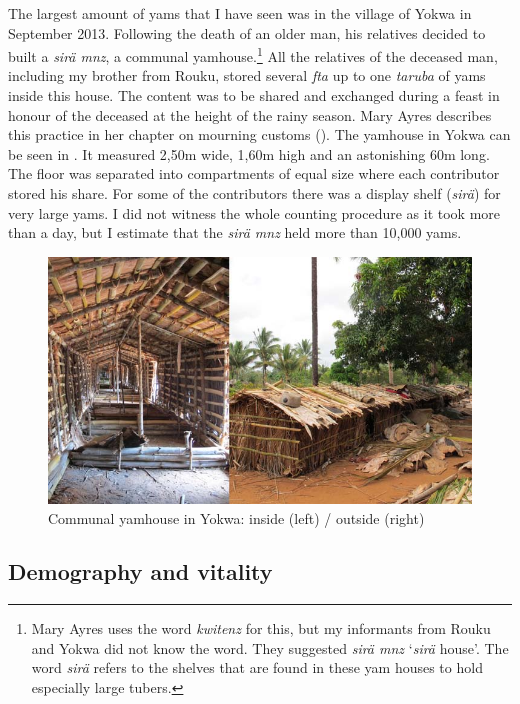 The largest amount of yams that I have seen was in the village of Yokwa in September 2013. Following the death of an older man, his relatives decided to built a \emph{sirä mnz}, a communal yamhouse.\footnote{Mary Ayres uses the word \emph{kwitenz} for this, but my informants from Rouku and Yokwa did not know the word. They suggested \emph{sirä mnz} `\emph{sirä} house'. The word \emph{sirä} refers to the shelves that are found in these yam houses to hold especially large tubers.} All the relatives of the deceased man, including my brother from Rouku, stored several \emph{fta} up to one \emph{taruba} of yams inside this house. The content was to be shared and exchanged during a feast in honour of the deceased at the height of the rainy season. Mary Ayres describes this practice in her chapter on mourning customs (\citeyear[289]{Ayres:ws}). The yamhouse in Yokwa can be seen in . It measured 2,50m wide, 1,60m high and an astonishing 60m long. The floor was separated into compartments of equal size where each contributor stored his share. For some of the contributors there was a display shelf (\emph{sirä}) for very large yams. I did not witness the whole counting procedure as it took more than a day, but I estimate that the \emph{sirä mnz} held more than 10,000 yams.

\begin{figure}
    \includegraphics[width=.9\textwidth]{figures/yam4.jpg}
  \caption[Communal yamhouse in Yokwa]{Communal yamhouse in Yokwa: inside (left) / outside (right)}
  \label{fig:yam4}
\end{figure}%

\subsection{Demography and vitality}

